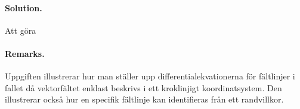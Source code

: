 \documentclass[%
oneside,                 %
final,                   %
10pt]{article}
\newenvironment{doconceexercise}{}{}
\begin{document}
\begin{doconceexercise}


\paragraph{Solution.}
Att göra



\paragraph{Remarks.}
Uppgiften illustrerar hur man ställer upp differentialekvationerna för fältlinjer i fallet då vektorfältet enklast beskrivs i ett kroklinjigt koordinatsystem. Den illustrerar också hur en specifik fältlinje kan identifieras från ett randvillkor.


\end{doconceexercise}


\end{document}
